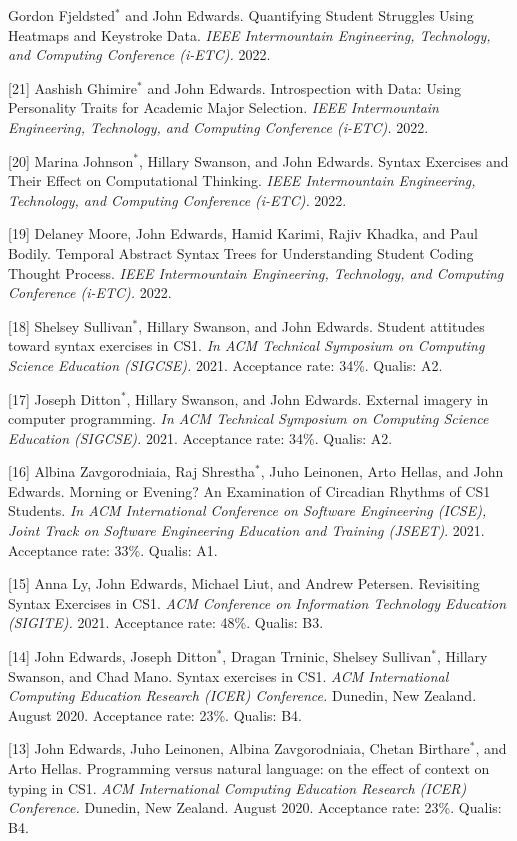 \documentclass[margin,line]{res}
\newcommand{\cnum}[1]{[#1]}
\begin{document}
\begin{resume}
\cnum{22} Gordon Fjeldsted$^*$ and John Edwards. Quantifying Student Struggles Using Heatmaps and Keystroke Data. \textit{IEEE Intermountain Engineering, Technology, and Computing Conference (i-ETC).} 2022.

\cnum{21} Aashish Ghimire$^*$ and John Edwards. Introspection with Data: Using Personality Traits for Academic Major Selection. \textit{IEEE Intermountain Engineering, Technology, and Computing Conference (i-ETC).} 2022.

\cnum{20} Marina Johnson$^*$, Hillary Swanson, and John Edwards. Syntax Exercises and Their Effect on Computational Thinking. \textit{IEEE Intermountain Engineering, Technology, and Computing Conference (i-ETC).} 2022.

\cnum{19} Delaney Moore, John Edwards, Hamid Karimi, Rajiv Khadka, and Paul Bodily. Temporal Abstract Syntax Trees for Understanding Student Coding Thought Process. \textit{IEEE Intermountain Engineering, Technology, and Computing Conference (i-ETC).} 2022.

\cnum{18} Shelsey Sullivan$^*$, Hillary Swanson, and John Edwards. Student attitudes toward syntax exercises in CS1. \textit{In ACM Technical Symposium on Computing Science Education (SIGCSE).} 2021. Acceptance rate: 34\%. Qualis: A2.

\cnum{17} Joseph Ditton$^*$, Hillary Swanson, and John Edwards. External imagery in computer programming. \textit{In ACM Technical Symposium on Computing Science Education (SIGCSE).} 2021. Acceptance rate: 34\%. Qualis: A2.

\cnum{16} Albina Zavgorodniaia, Raj Shrestha$^*$, Juho Leinonen, Arto Hellas, and John Edwards. Morning or Evening? An Examination of Circadian Rhythms of CS1 Students. \textit{In ACM International Conference on Software Engineering (ICSE), Joint Track on Software Engineering Education and Training (JSEET)}. 2021. Acceptance rate: 33\%. Qualis: A1.

\cnum{15} Anna Ly, John Edwards, Michael Liut, and Andrew Petersen. Revisiting Syntax Exercises in CS1. \textit{ACM Conference on Information Technology Education (SIGITE).} 2021. Acceptance rate: 48\%. Qualis: B3.

\cnum{14} John Edwards, Joseph Ditton$^*$, Dragan Trninic, Shelsey Sullivan$^*$, Hillary Swanson, and Chad Mano. Syntax exercises in CS1. \textit{ACM International Computing Education Research (ICER) Conference.} Dunedin, New Zealand. August 2020. Acceptance rate: 23\%. Qualis: B4.

\cnum{13} John Edwards, Juho Leinonen, Albina Zavgorodniaia, Chetan Birthare$^*$, and Arto Hellas. Programming versus natural language: on the effect of context on typing in CS1. \textit{ACM International Computing Education Research (ICER) Conference.} Dunedin, New Zealand. August 2020. Acceptance rate: 23\%. Qualis: B4.


\end{resume}
\end{document}
